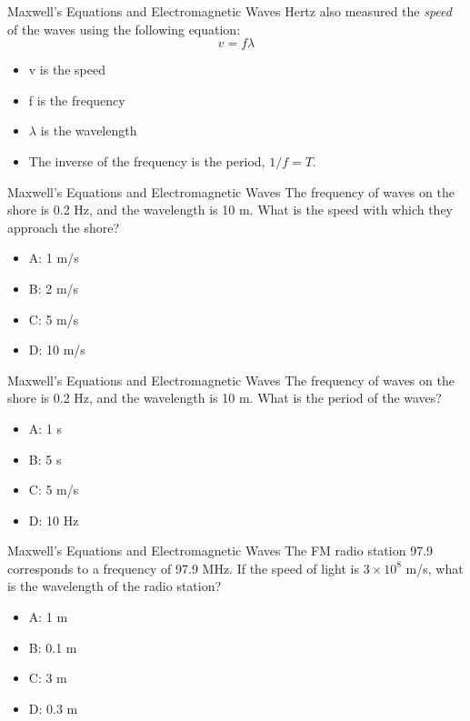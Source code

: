 \documentclass{beamer}
\begin{document}
\begin{frame}{Maxwell's Equations and Electromagnetic Waves}
Hertz also measured the \textit{speed} of the waves using the following equation:
\begin{equation}
v = f \lambda
\end{equation}
\begin{itemize}
\item v is the speed
\item f is the frequency
\item $\lambda$ is the wavelength
\item The inverse of the frequency is the period, $1/f = T$.
\end{itemize}
\end{frame}

\begin{frame}{Maxwell's Equations and Electromagnetic Waves}
The frequency of waves on the shore is 0.2 Hz, and the wavelength is 10 m.  What is the speed with which they approach the shore?
\begin{itemize}
\item A: 1 m/s
\item B: 2 m/s
\item C: 5 m/s
\item D: 10 m/s
\end{itemize}
\end{frame}

\begin{frame}{Maxwell's Equations and Electromagnetic Waves}
The frequency of waves on the shore is 0.2 Hz, and the wavelength is 10 m.  What is the period of the waves?
\begin{itemize}
\item A: 1 s
\item B: 5 s
\item C: 5 m/s
\item D: 10 Hz
\end{itemize}
\end{frame}

\begin{frame}{Maxwell's Equations and Electromagnetic Waves}
The FM radio station 97.9 corresponds to a frequency of 97.9 MHz.  If the speed of light is $3 \times 10^{8}$ m/s, what is the wavelength of the radio station?
\begin{itemize}
\item A: 1 m
\item B: 0.1 m
\item C: 3 m
\item D: 0.3 m
\end{itemize}
\end{frame}
\end{document}
